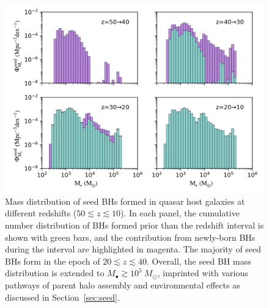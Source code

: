 \documentclass[twocolumn, twocolappendix]{aastex63}
\newcommand{\Msun}{M_\odot}
\begin{document}
\begin{CJK*}{UTF8}{gbsn}
\begin{figure}
\centering
\includegraphics[width=160mm]{seedBHMF_z.png}
\caption{
Mass distribution of seed BHs formed in quasar host galaxies at different redshifts ($50\lesssim z \lesssim 10$).
In each panel, the cumulative number distribution of BHs formed prior than the redshift interval is shown with green bars,
and the contribution from newly-born BHs during the interval are highlighted in magenta.
The majority of seed BHs form in the epoch of $20\lesssim z \lesssim 40$.
Overall, the seed BH mass distribution is extended to $M_\bullet \gtrsim 10^5~\Msun$, 
imprinted with various pathways of parent halo assembly and environmental effects as discussed in Section~\ref{sec:seed}.
}
\label{fig:seedmf}
\end{figure}



\end{CJK*}
\end{document}
